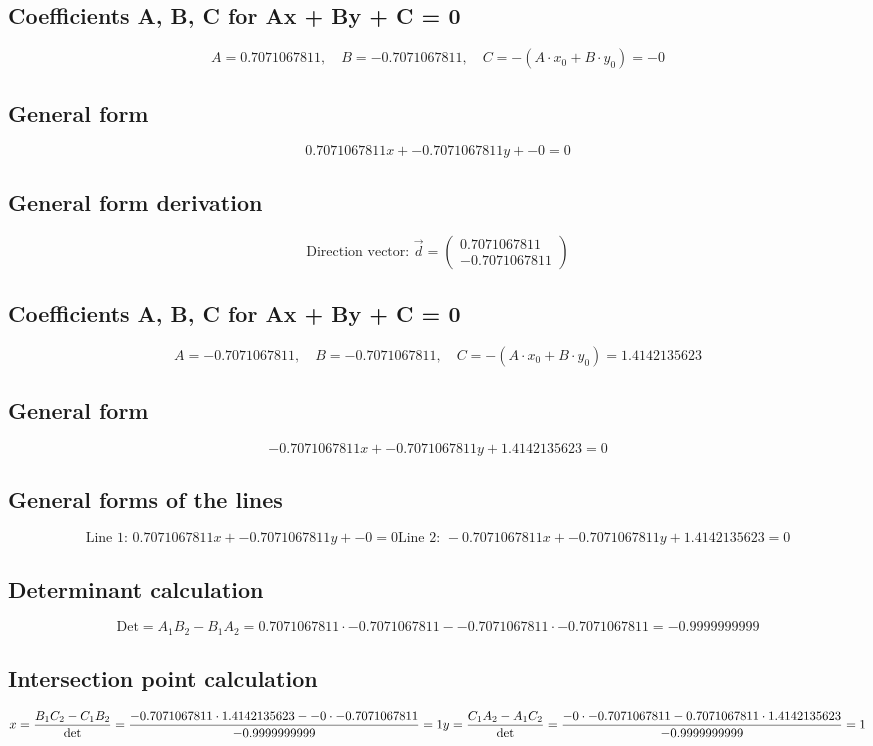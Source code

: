 \documentclass{article}
\begin{document}
\subsection*{ \vspace{1em} Coefficients A, B, C for Ax + By + C = 0}
\[
A = 0.7071067811,\quad B = -0.7071067811,\quad C = - (A \cdot x_0 + B \cdot y_0) = -0
\]
\subsection*{ \vspace{1em} General form}
\[
0.7071067811x + -0.7071067811y + -0 = 0
\]
\subsection*{ \vspace{1em} General form derivation}
\[
\text{Direction vector: } \vec{d} = \begin{pmatrix}0.7071067811 \\ -0.7071067811\end{pmatrix}
\]
\subsection*{ \vspace{1em} Coefficients A, B, C for Ax + By + C = 0}
\[
A = -0.7071067811,\quad B = -0.7071067811,\quad C = - (A \cdot x_0 + B \cdot y_0) = 1.4142135623
\]
\subsection*{ \vspace{1em} General form}
\[
-0.7071067811x + -0.7071067811y + 1.4142135623 = 0
\]
\subsection*{ \vspace{1em} General forms of the lines}
\[
\text{Line 1: } 0.7071067811x + -0.7071067811y + -0 = 0
\text{Line 2: } -0.7071067811x + -0.7071067811y + 1.4142135623 = 0
\]
\subsection*{ \vspace{1em} Determinant calculation}
\[
\text{Det} = A_1 B_2 - B_1 A_2 = 0.7071067811 \cdot -0.7071067811 - -0.7071067811 \cdot -0.7071067811 = -0.9999999999
\]
\subsection*{ \vspace{1em} Intersection point calculation}
\[
x = \frac{B_1 C_2 - C_1 B_2}{\det} = \frac{-0.7071067811 \cdot 1.4142135623 - -0 \cdot -0.7071067811}{-0.9999999999} = 1\\y = \frac{C_1 A_2 - A_1 C_2}{\det} = \frac{-0 \cdot -0.7071067811 - 0.7071067811 \cdot 1.4142135623}{-0.9999999999} = 1
\]
\end{document}
